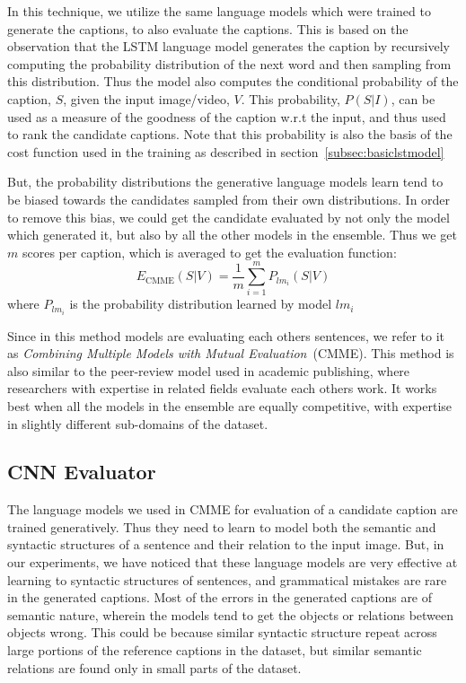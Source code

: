 In this technique, we utilize the same language models which were trained to generate
the captions, to also evaluate the captions.
This is based on the observation that the LSTM language model generates the
caption by recursively computing the probability distribution of the next word
and then sampling from this distribution.
Thus the model also computes the conditional probability of the caption, $S$,
given the input image/video, $V$.
This probability, $P(S|I)$, can be used as a measure of the goodness of the
caption w.r.t the input, and thus used to rank the candidate captions.
Note that this probability is also the basis of the cost function used in the
training as described in section~\ref{subsec:basiclstmodel}

But, the probability distributions the generative language models learn tend to
be biased towards the candidates sampled from their own distributions.
In order to remove this bias, we could get the candidate evaluated by not only
the model which generated it, but also by all the other models in the ensemble.
Thus we get $m$ scores per caption, which is averaged to get the evaluation
function:
\begin{equation}
  \label{eq:cmme} 
  E_{\text{CMME}}(S|V) = \frac{1}{m}\sum_{i=1}^{m} P_{lm_i}(S | V)
\end{equation}
\noindent where $P_{lm_i}$ is the probability distribution learned by model
$lm_i$

Since in this method models are evaluating each others sentences, we refer to it
as \emph{Combining Multiple Models with Mutual Evaluation}~(CMME).
This method is also similar to the peer-review model used in academic
publishing, where researchers with expertise in related fields evaluate each
others work.
It works best when all the models in the ensemble are equally competitive, with
expertise in slightly different sub-domains of the dataset.

\subsection{CNN Evaluator}
The language models we used in CMME for evaluation of a candidate caption are
trained generatively.
Thus they need to learn to model both the semantic and syntactic structures of a
sentence and their relation to the input image.
But, in our experiments, we have noticed that these language models are very
effective at learning to syntactic structures of sentences, and grammatical
mistakes are rare in the generated captions.
Most of the errors in the generated captions are of semantic nature, wherein the
models tend to get the objects or relations between objects wrong.
This could be because similar syntactic structure repeat across large portions
of the reference captions in the dataset, but similar semantic relations are
found only in small parts of the dataset.

